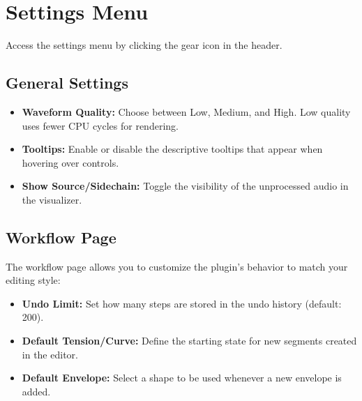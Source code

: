 \chapter{Settings Menu}
\label{ch:settings_menu}

Access the settings menu by clicking the gear icon in the header.

\section{General Settings}
\begin{itemize}
    \item \textbf{Waveform Quality:} Choose between Low, Medium, and High. Low quality uses fewer CPU cycles for rendering.
    \item \textbf{Tooltips:} Enable or disable the descriptive tooltips that appear when hovering over controls.
    \item \textbf{Show Source/Sidechain:} Toggle the visibility of the unprocessed audio in the visualizer.
\end{itemize}

\section{Workflow Page}
The workflow page allows you to customize the plugin's behavior to match your editing style:
\begin{itemize}
    \item \textbf{Undo Limit:} Set how many steps are stored in the undo history (default: 200).
    \item \textbf{Default Tension/Curve:} Define the starting state for new segments created in the editor.
    \item \textbf{Default Envelope:} Select a shape to be used whenever a new envelope is added.
\end{itemize}
